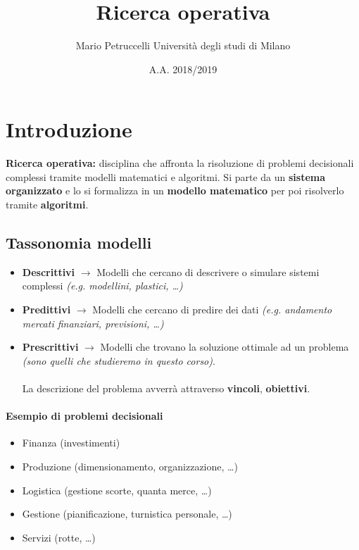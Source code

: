 \documentclass[12pt, twoside, letterpaper]{article}
\title{Ricerca operativa}
\author{Mario Petruccelli \cr Università degli studi di Milano}
\date{A.A. 2018/2019}
\begin{document}
	\begin{titlepage}
		\maketitle
		\newpage
		\tableofcontents
	\end{titlepage}


	\section{Introduzione}
	
		\textbf{Ricerca operativa:} disciplina che affronta la risoluzione di problemi decisionali complessi tramite 	modelli matematici e algoritmi.
	Si parte da un \textbf{sistema organizzato} e lo si formalizza in un \textbf{modello matematico} per poi risolverlo tramite \textbf{algoritmi}.
		\subsection{Tassonomia modelli}
		\begin{itemize}
			\item \textbf{Descrittivi} $\rightarrow$ Modelli che cercano di descrivere o simulare sistemi complessi \textit{(e.g. modellini, plastici, \dots)}
			\item \textbf{Predittivi} $\rightarrow$ Modelli che cercano di predire dei dati \textit{(e.g. andamento mercati finanziari, previsioni, \dots)}
			\item \textbf{Prescrittivi} $\rightarrow$ Modelli che trovano la soluzione ottimale ad un problema \textit{(sono quelli che studieremo in questo corso)}. 
			\\\\La descrizione del problema avverrà attraverso \textbf{vincoli}, \textbf{obiettivi}.
		\end{itemize}
		\paragraph{Esempio di problemi decisionali}
		\begin{itemize}
			\item Finanza (investimenti)
			\item Produzione (dimensionamento, organizzazione, \dots)
			\item Logistica (gestione scorte, quanta merce, \dots)
			\item Gestione (pianificazione, turnistica personale, \dots)
			\item Servizi (rotte, \dots)
		\end{itemize}
\end{document}
